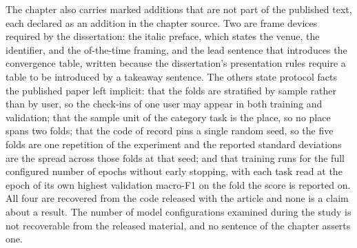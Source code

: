The chapter also carries marked additions that are not part of the published text, each
declared as an addition in the chapter source. Two are frame devices required by the
dissertation: the italic preface, which states the venue, the identifier, and the
of-the-time framing, and the lead sentence that introduces the convergence table, written
because the dissertation's presentation rules require a table to be introduced by a
takeaway sentence. The others state protocol facts the published paper left implicit: that
the folds are stratified by sample rather than by user, so the check-ins of one user may
appear in both training and validation; that the sample unit of the category task is the
place, so no place spans two folds; that the code of record pins a single random seed, so
the five folds are one repetition of the experiment and the reported standard deviations
are the spread across those folds at that seed; and that training runs for the full
configured number of epochs without early stopping, with each task read at the epoch of
its own highest validation macro-F1 on the fold the score is reported on. All four are
recovered from the code released with the article and none is a claim about a result. The
number of model configurations examined during the study is not recoverable from
the released material, and no sentence of the chapter asserts one.


